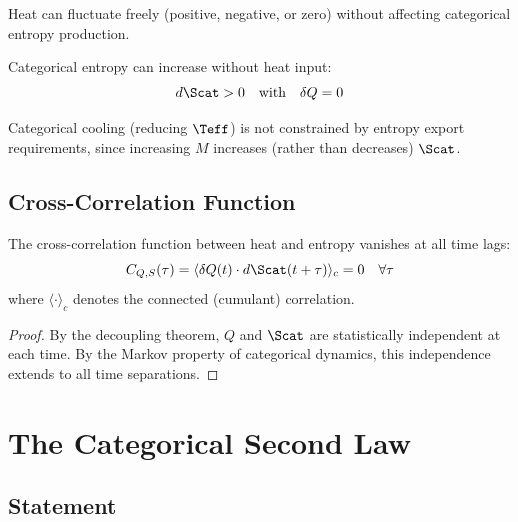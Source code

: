 \begin{corollary}
Heat can fluctuate freely (positive, negative, or zero) without affecting categorical entropy production.
\end{corollary}

\begin{corollary}
Categorical entropy can increase without heat input:
\begin{equation}
d\Scat > 0 \quad \text{with} \quad \delta Q = 0
\end{equation}
\end{corollary}

\begin{corollary}
Categorical cooling (reducing $\Teff$) is not constrained by entropy export requirements, since increasing $M$ increases (rather than decreases) $\Scat$.
\end{corollary}

\subsection{Cross-Correlation Function}

\begin{proposition}
The cross-correlation function between heat and entropy vanishes at all time lags:
\begin{equation}
C_{Q,S}(\tau) = \langle \delta Q(t) \cdot d\Scat(t+\tau) \rangle_c = 0 \quad \forall \tau
\end{equation}
where $\langle \cdot \rangle_c$ denotes the connected (cumulant) correlation.
\end{proposition}

\begin{proof}
By the decoupling theorem, $Q$ and $\Scat$ are statistically independent at each time. By the Markov property of categorical dynamics, this independence extends to all time separations.
\end{proof}

\section{The Categorical Second Law}

\subsection{Statement}

